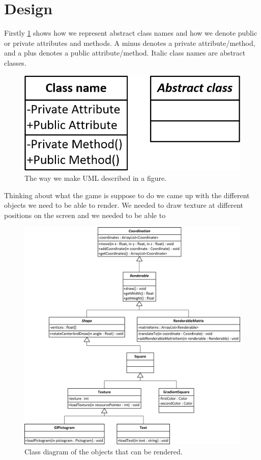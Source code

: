 \section{Design}
Firstly \ref{fig:terminology} shows how we represent abstract class names and how we denote public or private attributes and methods. A minus denotes a private attribute/method, and a plus denotes a public attribute/method. Italic class names are abstract classes. 
\begin{figure}[H]
\centering
\includegraphics[width=0.4\linewidth]{img/terminology.png}
\caption{The way we make UML described in a figure.}
\label{fig:terminology}
\end{figure}
Thinking about what the game is suppose to do we came up with the different objects we need to be able to render. We needed to draw texture at different positions on the screen and we needed to be able to 
\begin{figure}[H]
\centering
\includegraphics[width=0.9\linewidth]{img/renderables.png}%
\caption{Class diagram of the objects that can be rendered.}
\label{fig:renderables}
\end{figure}


